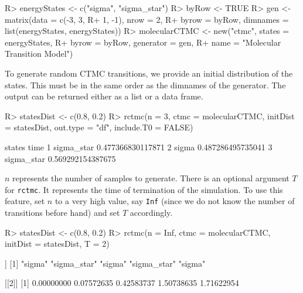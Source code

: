 \documentclass[
  nojss]{jss}
\begin{document}
\begin{CodeChunk}

\begin{CodeInput}
R> energyStates <- c("sigma", "sigma_star")
R> byRow <- TRUE
R> gen <- matrix(data = c(-3, 3,
R+                        1, -1), nrow = 2,
R+               byrow = byRow, dimnames = list(energyStates, energyStates))
R> molecularCTMC <- new("ctmc", states = energyStates, 
R+                  byrow = byRow, generator = gen, 
R+                  name = "Molecular Transition Model")      
\end{CodeInput}
\end{CodeChunk}

To generate random CTMC transitions, we provide an initial distribution of the states. This must be in the same order as the dimnames of the generator. The output can be returned either as a list or a data frame.

\begin{CodeChunk}

\begin{CodeInput}
R> statesDist <- c(0.8, 0.2)
R> rctmc(n = 3, ctmc = molecularCTMC, initDist = statesDist, out.type = "df", include.T0 = FALSE)
\end{CodeInput}

\begin{CodeOutput}
      states              time
1 sigma_star 0.477366830117871
2      sigma 0.487286495735041
3 sigma_star 0.569292154387675
\end{CodeOutput}
\end{CodeChunk}

\(n\) represents the number of samples to generate. There is an optional argument \(T\) for \texttt{rctmc}. It represents the time of termination of the simulation. To use this feature, set \(n\) to a very high value, say \texttt{Inf} (since we do not know the number of transitions before hand) and set \(T\) accordingly.

\begin{CodeChunk}

\begin{CodeInput}
R> statesDist <- c(0.8, 0.2)
R> rctmc(n = Inf, ctmc = molecularCTMC, initDist = statesDist, T = 2)
\end{CodeInput}

\begin{CodeOutput}
[[1]]
[1] "sigma"      "sigma_star" "sigma"      "sigma_star" "sigma"     

[[2]]
[1] 0.00000000 0.07572635 0.42583737 1.50738635 1.71622954
\end{CodeOutput}
\end{CodeChunk}
\end{document}
